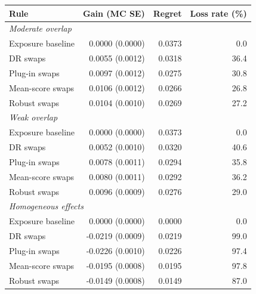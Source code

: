 \begin{tabular}{lrrr}
\toprule
Rule & Gain (MC SE) & Regret & Loss rate (\%) \\
\midrule
\multicolumn{4}{l}{\emph{Moderate overlap}} \\
Exposure baseline & 0.0000 (0.0000) & 0.0373 & 0.0 \\
DR swaps & 0.0055 (0.0012) & 0.0318 & 36.4 \\
Plug-in swaps & 0.0097 (0.0012) & 0.0275 & 30.8 \\
Mean-score swaps & 0.0106 (0.0012) & 0.0266 & 26.8 \\
Robust swaps & 0.0104 (0.0010) & 0.0269 & 27.2 \\
\midrule
\multicolumn{4}{l}{\emph{Weak overlap}} \\
Exposure baseline & 0.0000 (0.0000) & 0.0373 & 0.0 \\
DR swaps & 0.0052 (0.0010) & 0.0320 & 40.6 \\
Plug-in swaps & 0.0078 (0.0011) & 0.0294 & 35.8 \\
Mean-score swaps & 0.0080 (0.0011) & 0.0292 & 36.2 \\
Robust swaps & 0.0096 (0.0009) & 0.0276 & 29.0 \\
\midrule
\multicolumn{4}{l}{\emph{Homogeneous effects}} \\
Exposure baseline & 0.0000 (0.0000) & 0.0000 & 0.0 \\
DR swaps & -0.0219 (0.0009) & 0.0219 & 99.0 \\
Plug-in swaps & -0.0226 (0.0010) & 0.0226 & 97.4 \\
Mean-score swaps & -0.0195 (0.0008) & 0.0195 & 97.8 \\
Robust swaps & -0.0149 (0.0008) & 0.0149 & 87.0 \\
\bottomrule
\end{tabular}
